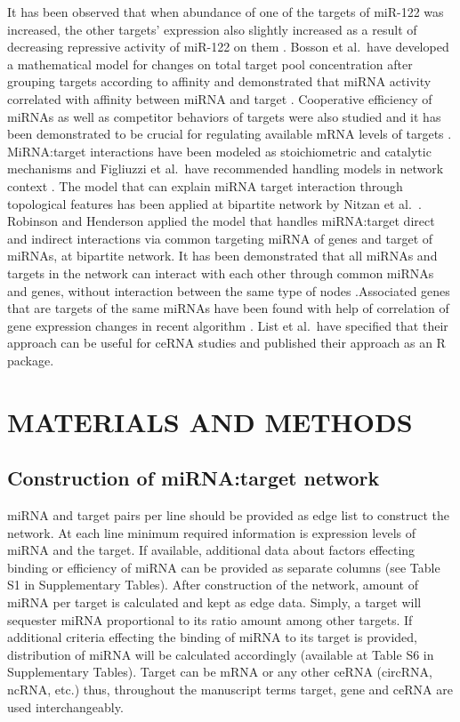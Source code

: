 \documentclass[a4,center,fleqn]{NAR}
\begin{document}
\enlargethispage{-65.1pt}

It has been observed that when abundance of one of the targets of
miR-122 was increased, the other targets' expression also slightly
increased as a result of decreasing repressive activity of miR-122 on
them \citep{denzler_assessing_2014}. Bosson et al.~have developed a
mathematical model for changes on total target pool concentration after
grouping targets according to affinity and demonstrated that miRNA
activity correlated with affinity between miRNA and target
\citep{bosson_endogenous_2014}. Cooperative efficiency of miRNAs as well
as competitor behaviors of targets were also studied and it has been
demonstrated to be crucial for regulating available mRNA levels of
targets \citep{denzler_impact_2016}. MiRNA:target interactions have been
modeled as stoichiometric and catalytic mechanisms and Figliuzzi et
al.~have recommended handling models in network context
\citep{figliuzzi_micrornas_2013}. The model that can explain miRNA
target interaction through topological features has been applied at
bipartite network by Nitzan et al.~\citep{nitzan_interactions_2014}.
Robinson and Henderson applied the model that handles miRNA:target
direct and indirect interactions via common targeting miRNA of genes and
target of miRNAs, at bipartite network. It has been demonstrated that
all miRNAs and targets in the network can interact with each other
through common miRNAs and genes, without interaction between the same
type of nodes \citep{robinson_modelling_2018}.Associated genes that are
targets of the same miRNAs have been found with help of correlation of
gene expression changes in recent algorithm
\citep{markus_list_sponge_2017}. List et al.~have specified that their
approach can be useful for ceRNA studies and published their approach as
an R package.

\section{MATERIALS AND METHODS}

\subsection{Construction of miRNA:target network}

miRNA and target pairs per line should be provided as edge list to
construct the network. At each line minimum required information is
expression levels of miRNA and the target. If available, additional data
about factors effecting binding or efficiency of miRNA can be provided
as separate columns (see Table S1 in Supplementary Tables). After
construction of the network, amount of miRNA per target is calculated
and kept as edge data. Simply, a target will sequester miRNA
proportional to its ratio amount among other targets. If additional
criteria effecting the binding of miRNA to its target is provided,
distribution of miRNA will be calculated accordingly (available at Table
S6 in Supplementary Tables). Target can be mRNA or any other ceRNA
(circRNA, ncRNA, etc.) thus, throughout the manuscript terms target,
gene and ceRNA are used interchangeably.
\end{document}
